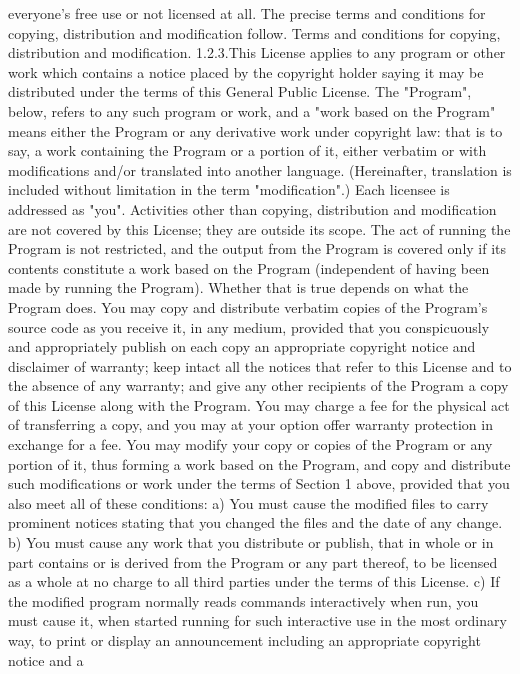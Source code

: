 \documentclass[12pt]{article}
\begin{document}
everyone's free use or not licensed at all.
The precise terms and conditions for copying, distribution and modification follow.
Terms and conditions for copying, distribution and modification.
1.2.3.This License applies to any program or other work which contains a notice placed by the
copyright holder saying it may be distributed under the terms of this General Public License.
The "Program", below, refers to any such program or work, and a "work based on the
Program" means either the Program or any derivative work under copyright law: that is to
say, a work containing the Program or a portion of it, either verbatim or with modifications
and/or translated into another language. (Hereinafter, translation is included without
limitation in the term "modification".) Each licensee is addressed as "you". Activities other
than copying, distribution and modification are not covered by this License; they are outside
its scope. The act of running the Program is not restricted, and the output from the Program
is covered only if its contents constitute a work based on the Program (independent of
having been made by running the Program). Whether that is true depends on what the
Program does.
You may copy and distribute verbatim copies of the Program's source code as you receive it,
in any medium, provided that you conspicuously and appropriately publish on each copy an
appropriate copyright notice and disclaimer of warranty; keep intact all the notices that refer
to this License and to the absence of any warranty; and give any other recipients of the
Program a copy of this License along with the Program. You may charge a fee for the
physical act of transferring a copy, and you may at your option offer warranty protection in
exchange for a fee.
You may modify your copy or copies of the Program or any portion of it, thus forming a work
based on the Program, and copy and distribute such modifications or work under the terms
of Section 1 above, provided that you also meet all of these conditions:
a) You must cause the modified files to carry prominent notices stating that you
changed the files and the date of any change.
b) You must cause any work that you distribute or publish, that in whole or in part
contains or is derived from the Program or any part thereof, to be licensed as a
whole at no charge to all third parties under the terms of this License.
c) If the modified program normally reads commands interactively when run, you must
cause it, when started running for such interactive use in the most ordinary way, to
print or display an announcement including an appropriate copyright notice and a
\end{document}
